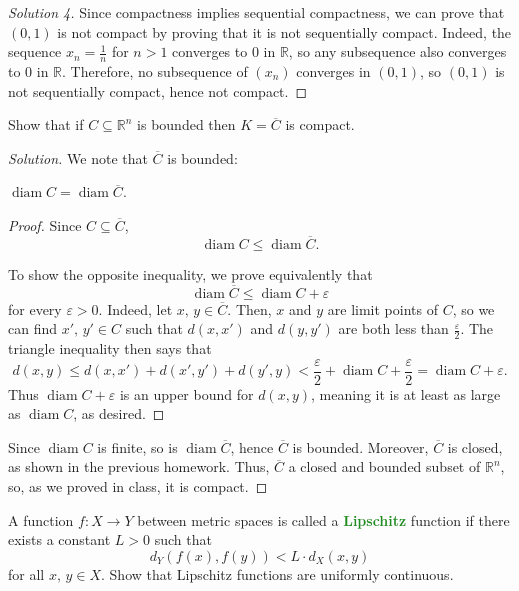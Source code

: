 \documentclass[11pt]{scrartcl}
\providecommand{\ol}{\overline}
\providecommand{\eps}{\varepsilon}
\providecommand{\RR}{\mathbb R}
\newenvironment{soln}{\begin{proof}[Solution]}{\end{proof}}
\providecommand{\vocab}[1]{{\textbf{\textcolor{ForestGreen}{#1}}}}
\begin{document}
\begin{proof}[Solution 4]
	Since compactness implies sequential compactness,
	we can prove that $(0,1)$ is not compact
	by proving that it is not sequentially compact.
	Indeed, the sequence $x_n = \frac 1n$ for $n > 1$
	converges to $0$ in $\RR$, so any subsequence
	also converges to $0$ in $\RR$.
	Therefore, no subsequence of $(x_n)$ converges in $(0,1)$,
	so $(0,1)$ is not sequentially compact, hence not compact.
\end{proof}

\begin{problem}
	Show that if $C\subseteq\RR^n$ is bounded then $K = \ol C$ is compact.
\end{problem}

\begin{soln}
	We note that $\ol C$ is bounded:
	\begin{claim}
		$\operatorname{diam}C = \operatorname{diam}\ol C$.
	\end{claim}
	\begin{proof}
		Since $C\subseteq\ol C$,
		\[\operatorname{diam} C \le \operatorname{diam}\ol C.\]
		
		To show the opposite inequality, we prove equivalently that
		\[\operatorname{diam}\ol C \le \operatorname{diam} C + \eps\]
		for every $\eps > 0$.
		Indeed, let $x,\,y\in\ol C$. Then, $x$ and $y$ are limit points of $C$,
		so we can find $x',\,y'\in C$ such that
		$d(x,x')$ and $d(y, y')$ are both less than $\frac\eps 2$.
		The triangle inequality then says that
		\[d(x, y) \le d(x, x') + d(x', y') + d(y', y)
		< \frac\eps 2 + \operatorname{diam}C + \frac\eps2
		= \operatorname{diam} C + \eps.\]
		Thus $\operatorname{diam} C + \eps$ is an upper bound
		for $d(x, y)$, meaning it is at least as large as
		$\operatorname{diam} C$, as desired.
	\end{proof}
	
	Since $\operatorname{diam}C$ is finite,
	so is $\operatorname{diam}\ol C$, hence $\ol C$ is bounded.
	Moreover, $\ol C$ is closed, as shown in the previous homework.
	Thus, $\ol C$ a closed and bounded subset of $\RR^n$,
	so, as we proved in class, it is compact.
\end{soln}


\begin{problem}
	A function $f\colon X\to Y$ between metric spaces is called
	a \vocab{Lipschitz} function if there exists a constant $L > 0$ such that
	\[d_Y(f(x), f(y)) < L\cdot d_X(x, y)\]
	for all $x,\,y\in X$.
	Show that Lipschitz functions are uniformly continuous.
\end{problem}
\end{document}
